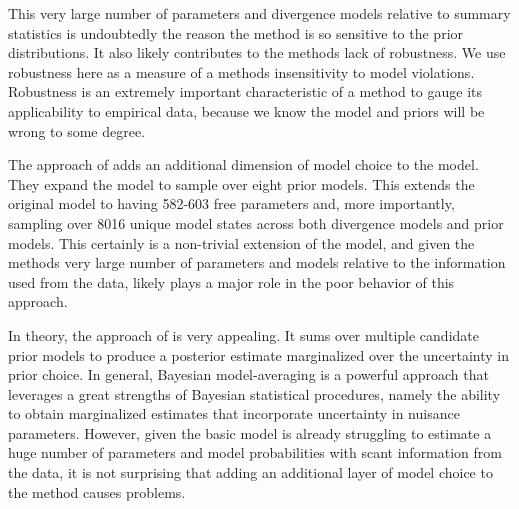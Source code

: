 \documentclass[letterpaper,12pt]{article}
\begin{document}
\begin{linenumbers}
This very large number of parameters and divergence models relative to 
summary statistics is undoubtedly the reason the method is so sensitive
to the prior distributions.
It also likely contributes to the methods lack of robustness.
We use robustness here as a measure of a methods insensitivity to model
violations.
Robustness is an extremely important characteristic of a method to gauge its
applicability to empirical data, because we know the model and priors will be
wrong to some degree.

The approach of \citet{Hickerson2013} adds an additional dimension of model
choice to the model. They expand the model to sample over eight prior models.
This extends the original model to having 582-603 free parameters and, more
importantly, sampling over 8016 unique model states across both divergence
models and prior models.
This certainly is a non-trivial extension of the model, and given the methods
very large number of parameters and models relative to the information
used from the data, likely plays a major role in the poor behavior of this
approach.

In theory, the approach of \citet{Hickerson2013} is very appealing.  It sums
over multiple candidate prior models to produce a posterior estimate
marginalized over the uncertainty in prior choice.
In general, Bayesian model-averaging is a powerful approach that leverages a
great strengths of Bayesian statistical procedures, namely the ability to
obtain marginalized estimates that incorporate uncertainty in nuisance
parameters.
However, given the basic \msb model is already struggling to estimate
a huge number of parameters and model probabilities with scant information
from the data, it is not surprising that adding an additional layer of
model choice to the method causes problems.


\end{linenumbers}
\end{document}
